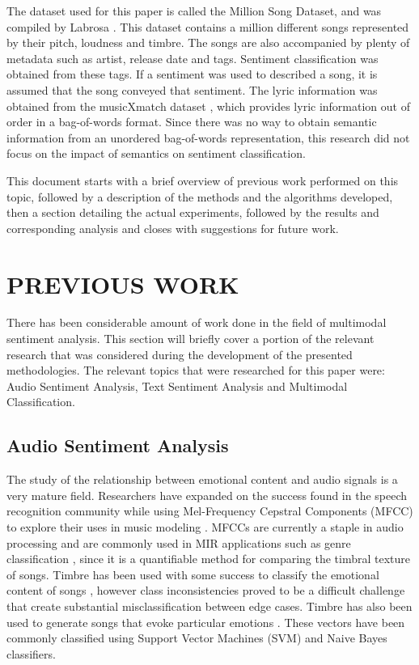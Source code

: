   The dataset used for this paper is called the Million Song Dataset, and 
  was compiled by Labrosa \cite{Bertin-Mahieux2011}. This dataset contains a million different songs
  represented by their pitch, loudness and timbre. The songs are also accompanied 
  by plenty of metadata such as artist, release date and  tags. Sentiment classification
   was obtained from these tags. If a sentiment was used to described a song, it is assumed that 
  the song conveyed that sentiment. The lyric information was obtained from the
  musicXmatch dataset  \cite{musicXmatchDataset}, which provides lyric information out of order in a 
  bag-of-words format. Since there was no way to obtain semantic information 
  from an unordered bag-of-words representation, this research did not focus 
  on the impact of semantics on sentiment classification. 
      
 This document starts with a brief overview of previous work performed on this 
 topic, followed by a description of the methods and the algorithms developed,
 then a section detailing the actual experiments, followed by the results and corresponding analysis
 and closes with suggestions for future work.
 
 \chapter{PREVIOUS WORK}

There has been considerable amount of work done in the field of multimodal 
sentiment analysis. This section will briefly cover a portion of the relevant 
research that was considered during the development of the presented 
methodologies. The relevant topics that were researched for this paper were: Audio Sentiment 
Analysis, Text Sentiment Analysis and Multimodal Classification.


\section*{Audio Sentiment Analysis}

The study of the relationship between emotional content and audio signals is a 
very mature field. Researchers have expanded on the success found in the 
speech recognition community while using Mel-Frequency Cepstral Components 
(MFCC) to explore their uses in music modeling \cite{Logan00melfrequency}. MFCCs are currently a 
staple in audio processing and are commonly used in MIR applications such 
as genre classification \cite{Tzanetakis01automaticmusical}, since it is a quantifiable method for comparing the 
timbral texture of songs. Timbre has been used with some success to classify the 
emotional content of songs \cite{University03detectingemotion}, however class inconsistencies proved to be 
a difficult challenge that create substantial misclassification between edge cases. 
Timbre has also been used to generate songs that evoke particular emotions \cite{transprose}.  
These vectors have been commonly classified using 
Support Vector Machines (SVM) and Naive Bayes classifiers. 

